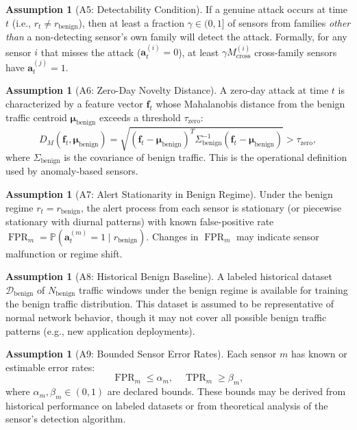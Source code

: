 \documentclass[11pt,a4paper]{article}
\theoremstyle{definition}
\newtheorem{assumption}[theorem]{Assumption}
\theoremstyle{remark}
\DeclareMathOperator{\TPR}{TPR}
\DeclareMathOperator{\FPR}{FPR}
\newcommand{\Pbb}{\mathbb{P}}
\newcommand{\cD}{\mathcal{D}}
\newcommand{\alertvec}{\mathbf{a}}
\newcommand{\flowvec}{\mathbf{f}}
\begin{document}
\begin{assumption}[A5: Detectability Condition]
\label{ass:A5}
If a genuine attack occurs at time $t$ (i.e., $r_t \neq r_{\mathrm{benign}}$), then at least a fraction $\gamma \in (0, 1]$ of sensors from families \textit{other than} a non-detecting sensor's own family will detect the attack. Formally, for any sensor $i$ that misses the attack ($\alertvec_t^{(i)} = 0$), at least $\gamma M_{\mathrm{cross}}^{(i)}$ cross-family sensors have $\alertvec_t^{(j)} = 1$.
\end{assumption}

\begin{assumption}[A6: Zero-Day Novelty Distance]
\label{ass:A6}
A zero-day attack at time $t$ is characterized by a feature vector $\flowvec_t$ whose Mahalanobis distance from the benign traffic centroid $\boldsymbol{\mu}_{\mathrm{benign}}$ exceeds a threshold $\tau_{\mathrm{zero}}$:
\begin{equation}
D_M(\flowvec_t, \boldsymbol{\mu}_{\mathrm{benign}}) = \sqrt{(\flowvec_t - \boldsymbol{\mu}_{\mathrm{benign}})^T \Sigma_{\mathrm{benign}}^{-1} (\flowvec_t - \boldsymbol{\mu}_{\mathrm{benign}})} > \tau_{\mathrm{zero}},
\label{eq:zero_day}
\end{equation}
where $\Sigma_{\mathrm{benign}}$ is the covariance of benign traffic. This is the operational definition used by anomaly-based sensors.
\end{assumption}

\begin{assumption}[A7: Alert Stationarity in Benign Regime]
\label{ass:A7}
Under the benign regime $r_t = r_{\mathrm{benign}}$, the alert process from each sensor is stationary (or piecewise stationary with diurnal patterns) with known false-positive rate $\FPR_m = \Pbb(\alertvec_t^{(m)} = 1 \mid r_{\mathrm{benign}})$. Changes in $\FPR_m$ may indicate sensor malfunction or regime shift.
\end{assumption}

\begin{assumption}[A8: Historical Benign Baseline]
\label{ass:A8}
A labeled historical dataset $\cD_{\mathrm{benign}}$ of $N_{\mathrm{benign}}$ traffic windows under the benign regime is available for training the benign traffic distribution. This dataset is assumed to be representative of normal network behavior, though it may not cover all possible benign traffic patterns (e.g., new application deployments).
\end{assumption}

\begin{assumption}[A9: Bounded Sensor Error Rates]
\label{ass:A9}
Each sensor $m$ has known or estimable error rates:
\begin{equation}
\FPR_m \leq \alpha_m, \quad \TPR_m \geq \beta_m,
\label{eq:bounded_rates}
\end{equation}
where $\alpha_m, \beta_m \in (0, 1)$ are declared bounds. These bounds may be derived from historical performance on labeled datasets or from theoretical analysis of the sensor's detection algorithm.
\end{assumption}
\end{document}
